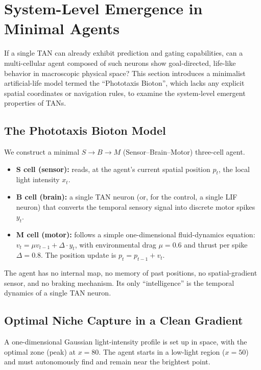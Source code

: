 \section{System-Level Emergence in Minimal Agents}\label{sec:emergent-agent}

If a single TAN can already exhibit prediction and gating capabilities, can a multi-cellular agent composed of such neurons show goal-directed, life-like behavior in macroscopic physical space? This section introduces a minimalist artificial-life model termed the ``Phototaxis Bioton'', which lacks any explicit spatial coordinates or navigation rules, to examine the system-level emergent properties of TANs.

\subsection{The Phototaxis Bioton Model}

We construct a minimal $S \to B \to M$ (Sensor--Brain--Motor) three-cell agent.

\begin{itemize}
    \item \textbf{S cell (sensor):} reads, at the agent's current spatial position $p_t$, the local light intensity $x_t$.
    \item \textbf{B cell (brain):} a single TAN neuron (or, for the control, a single LIF neuron) that converts the temporal sensory signal into discrete motor spikes $y_t$.
    \item \textbf{M cell (motor):} follows a simple one-dimensional fluid-dynamics equation: $v_t = \mu v_{t-1} + \Delta \cdot y_t$, with environmental drag $\mu = 0.6$ and thrust per spike $\Delta = 0.8$. The position update is $p_t = p_{t-1} + v_t$.
\end{itemize}

The agent has no internal map, no memory of past positions, no spatial-gradient sensor, and no braking mechanism. Its only ``intelligence'' is the temporal dynamics of a single TAN neuron.

\subsection{Optimal Niche Capture in a Clean Gradient}

A one-dimensional Gaussian light-intensity profile is set up in space, with the optimal zone (peak) at $x = 80$. The agent starts in a low-light region ($x = 50$) and must autonomously find and remain near the brightest point.

